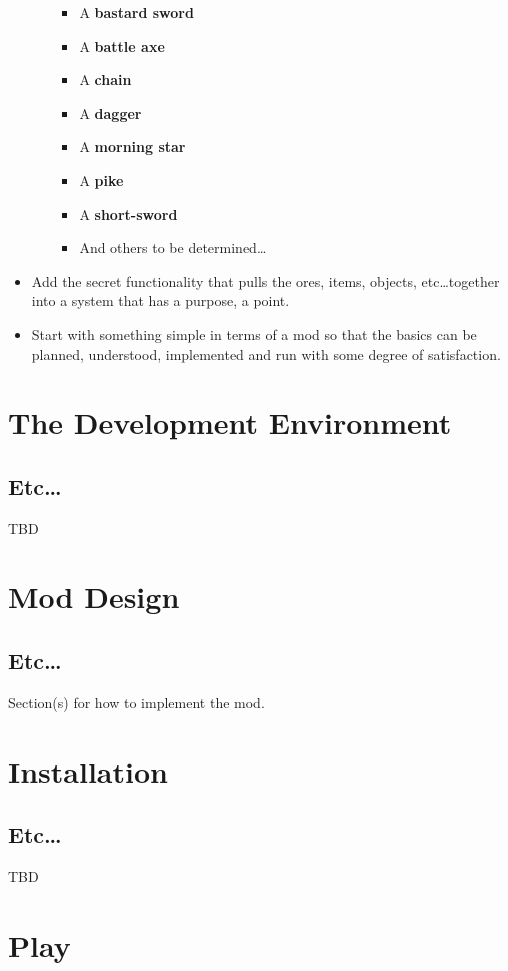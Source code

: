 \documentclass[12pt]{memoir}
\begin{document}
\begin{itemize}
\begin{itemize}
   \begin{itemize}
      \item A {\textbf{bastard sword}}
      \item A {\textbf{battle axe}}
      \item A {\textbf{chain}}
      \item A {\textbf{dagger}}
      \item A {\textbf{morning star}}
      \item A {\textbf{pike}}
      \item A {\textbf{short-sword}}
      \item And others to be determined\ldots
   \end{itemize}
\end{itemize}
\item Add the secret functionality that pulls the ores, items, objects, etc\ldots together into
 a system that has a purpose, a point.  
\item Start with something simple in terms of a mod so that the basics can be planned, understood,
implemented and run with some degree of satisfaction.  
\end{itemize}

\chapter{The Development Environment}
\section{Etc\dots}

TBD

\chapter{Mod Design}
\section{Etc\ldots}
Section(s) for how to implement the mod.


\chapter{Installation}
\section{Etc\dots}
TBD

\chapter{Play}
\end{document}
